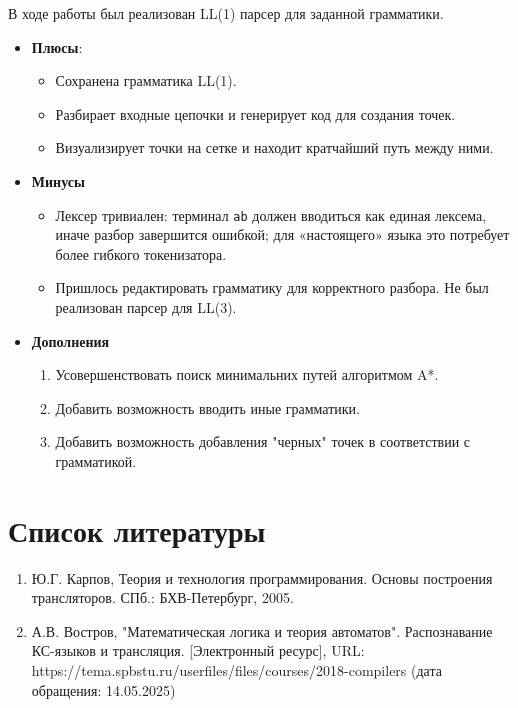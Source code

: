 \documentclass[areasetadvanced]{scrartcl}
\begin{document}
В ходе работы был реализован LL(1) парсер для заданной грамматики.

\begin{itemize}
\item \textbf{Плюсы}:
\begin{itemize}
    \item Сохранена грамматика LL(1).
    \item Разбирает входные цепочки и генерирует код для создания точек.
    \item Визуализирует точки на сетке и находит кратчайший путь между ними.
\end{itemize}


  \item \textbf{Минусы}
        \begin{itemize}
          \item Лексер тривиален: терминал \texttt{ab} должен
                вводиться как единая лексема, иначе разбор завершится
                ошибкой; для «настоящего» языка это потребует
                более гибкого токенизатора.
          \item Пришлось редактировать грамматику для корректного
                разбора. Не был реализован парсер для LL(3).
        \end{itemize}

  \item \textbf{Дополнения}
        \begin{enumerate}
          \item Усовершенствовать поиск минимальних путей алгоритмом A*.
          \item Добавить возможность вводить иные грамматики.
          \item Добавить возможность добавления "черных" точек в соответствии с грамматикой.
        \end{enumerate}
\end{itemize}

\newpage
\section*{Список литературы}
\begin{enumerate}
  \item Ю.Г. Карпов, Теория и технология программирования. Основы построения
  трансляторов. СПб.: БХВ-Петербург, 2005.
  \item А.В. Востров, "Математическая логика и теория автоматов". Распознавание КС-языков и трансляция. [Электронный ресурс], URL: https://tema.spbstu.ru/userfiles/files/courses/2018-compilers (дата обращения: 14.05.2025)
\end{enumerate}
\end{document}
